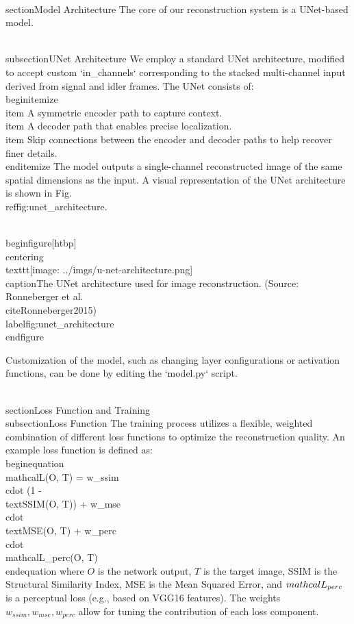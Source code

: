 \documentclass[10pt,journal]{IEEEtran} %
\begin{document}
\\section{Model Architecture}
The core of our reconstruction system is a UNet-based model.

\\subsection{UNet Architecture}
We employ a standard UNet architecture, modified to accept custom `in_channels` corresponding to the stacked multi-channel input derived from signal and idler frames. The UNet consists of:
\\begin{itemize}
    \\item A symmetric encoder path to capture context.
    \\item A decoder path that enables precise localization.
    \\item Skip connections between the encoder and decoder paths to help recover finer details.
\\end{itemize}
The model outputs a single-channel reconstructed image of the same spatial dimensions as the input. A visual representation of the UNet architecture is shown in Fig. \\ref{fig:unet_architecture}.

\\begin{figure}[htbp]
    \\centering
    \\texttt{[image: ../imgs/u-net-architecture.png]} %
    \\caption{The UNet architecture used for image reconstruction. (Source: Ronneberger et al. \\cite{Ronneberger2015})}
    \\label{fig:unet_architecture}
\\end{figure}

Customization of the model, such as changing layer configurations or activation functions, can be done by editing the `model.py` script.

\\section{Loss Function and Training}
\\subsection{Loss Function}
The training process utilizes a flexible, weighted combination of different loss functions to optimize the reconstruction quality. An example loss function is defined as:
\\begin{equation}
\\mathcal{L}(O, T) = w_{ssim} \\cdot (1 - \\text{SSIM}(O, T)) + w_{mse} \\cdot \\text{MSE}(O, T) + w_{perc} \\cdot \\mathcal{L}_{perc}(O, T)
\\end{equation}
where $O$ is the network output, $T$ is the target image, SSIM is the Structural Similarity Index, MSE is the Mean Squared Error, and $\\mathcal{L}_{perc}$ is a perceptual loss (e.g., based on VGG16 features). The weights $w_{ssim}, w_{mse}, w_{perc}$ allow for tuning the contribution of each loss component.
\end{document}

